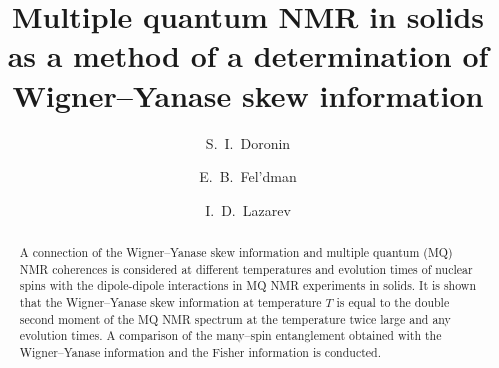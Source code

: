 \documentclass[preprint,12pt]{elsarticle}
\begin{document}
\begin{frontmatter}



\title{Multiple quantum NMR in solids as a method of a determination of Wigner--Yanase skew information}





\author[icp]{S.~I.~Doronin}
\author[icp]{E.~B.~Fel'dman}
\author[icp,msu]{I.~D.~Lazarev}
\address[icp]{Institute of Problems of Chemical Physics of Russian Academy of Sciences, \\ Chernogolovka, Moscow Region, Russia 142432}
\address[msu]{Faculty of Fundamental Physical-Chemical Engineering, Lomonosov Moscow State University, GSP-1, Moscow, Russia 119991}

\begin{abstract}
A connection of the Wigner--Yanase skew information and multiple quantum (MQ) NMR coherences is considered at different temperatures and evolution times of nuclear spins with the dipole-dipole interactions in MQ NMR experiments in solids.
It is shown that the Wigner--Yanase skew information at temperature $T$ is equal to the double second moment of the MQ NMR spectrum at the temperature twice large and any evolution times.
A comparison of the many--spin entanglement obtained with the Wigner--Yanase information and the Fisher information is conducted.
\end{abstract}


\end{frontmatter}
\end{document}
